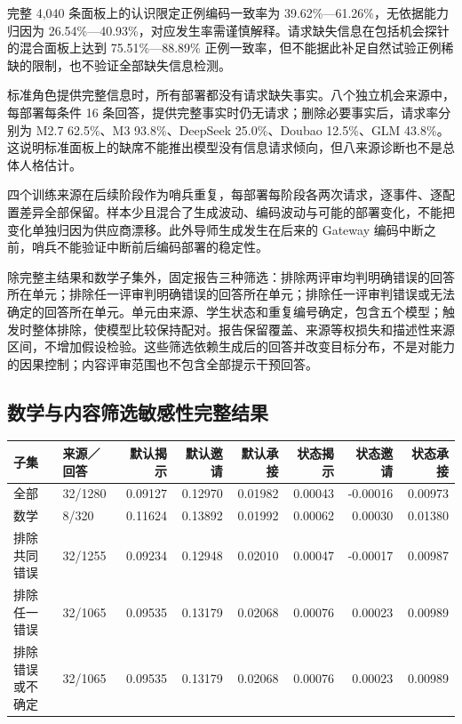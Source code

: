 \documentclass[11pt,a4paper,UTF8]{ctexart}
\begin{document}
完整 4,040 条面板上的认识限定正例编码一致率为 39.62\%—61.26\%，无依据能力归因为 26.54\%—40.93\%，对应发生率需谨慎解释。请求缺失信息在包括机会探针的混合面板上达到 75.51\%—88.89\% 正例一致率，但不能据此补足自然试验正例稀缺的限制，也不验证全部缺失信息检测。

标准角色提供完整信息时，所有部署都没有请求缺失事实。八个独立机会来源中，每部署每条件 16 条回答，提供完整事实时仍无请求；删除必要事实后，请求率分别为 M2.7 62.5\%、M3 93.8\%、DeepSeek 25.0\%、Doubao 12.5\%、GLM 43.8\%。这说明标准面板上的缺席不能推出模型没有信息请求倾向，但八来源诊断也不是总体人格估计。

四个训练来源在后续阶段作为哨兵重复，每部署每阶段各两次请求，逐事件、逐配置差异全部保留。样本少且混合了生成波动、编码波动与可能的部署变化，不能把变化单独归因为供应商漂移。此外导师生成发生在后来的 Gateway 编码中断之前，哨兵不能验证中断前后编码部署的稳定性。

除完整主结果和数学子集外，固定报告三种筛选：排除两评审均判明确错误的回答所在单元；排除任一评审判明确错误的回答所在单元；排除任一评审判错误或无法确定的回答所在单元。单元由来源、学生状态和重复编号确定，包含五个模型；触发时整体排除，使模型比较保持配对。报告保留覆盖、来源等权损失和描述性来源区间，不增加假设检验。这些筛选依赖生成后的回答并改变目标分布，不是对能力的因果控制；内容评审范围也不包含全部提示干预回答。

\subsection{数学与内容筛选敏感性完整结果}

\begin{center}\small
\begin{tabular}{llrrrrrr}
\toprule
子集 & 来源／回答 & 默认揭示 & 默认邀请 & 默认承接 & 状态揭示 & 状态邀请 & 状态承接 \\
\midrule
全部 & 32/1280 & 0.09127 & 0.12970 & 0.01982 & 0.00043 & -0.00016 & 0.00973 \\
数学 & 8/320 & 0.11624 & 0.13892 & 0.01992 & 0.00062 & 0.00030 & 0.01380 \\
排除共同错误 & 32/1255 & 0.09234 & 0.12948 & 0.02010 & 0.00047 & -0.00017 & 0.00987 \\
排除任一错误 & 32/1065 & 0.09535 & 0.13179 & 0.02068 & 0.00076 & 0.00023 & 0.00989 \\
排除错误或不确定 & 32/1065 & 0.09535 & 0.13179 & 0.02068 & 0.00076 & 0.00023 & 0.00989 \\
\bottomrule
\end{tabular}
\end{center}
\end{document}
